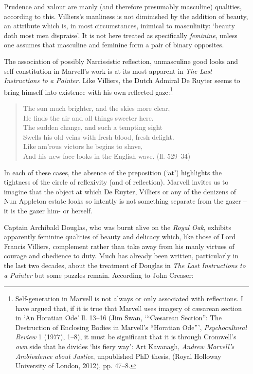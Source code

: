 ﻿\documentclass[12pt]{article}
\newcommand{\citedtitle}[1]{\textit{#1}}
\begin{document}
Prudence
and valour are manly (and therefore presumably masculine) qualities, according
to this. Villiers’s manliness is not diminished by the addition of beauty, an
attribute which is, in most circumstances, inimical to masculinity: ‘beauty
doth most men dispraise’. It is not here treated as specifically \emph{feminine}, unless one assumes
that masculine and feminine form a pair of binary opposites.

The
association of possibly Narcissistic reflection, unmasculine good looks and
self-constitution in Marvell’s work is at its most apparent in \citedtitle{The
Last Instructions to a Painter}. Like Villiers, the Dutch Admiral De Ruyter seems to
bring himself into existence with his own reflected gaze:\footnote{Self-generation in Marvell is not always or only associated with reflections. I have argued that, if it is true that Marvell uses imagery of cæsarean section in  ‘An Horatian
Ode’ ll. 13–16 (Jim Swan, ‘“Cæsarean Section”: The Destruction of Enclosing Bodies in Marvell’s “Horatian Ode”’, \citedtitle{Psychocultural Review} 1 (1977), 1–8), it must
be significant that it is through Cromwell’s \emph{own} side that he divides ‘his fiery way’: Art Kavanagh, \citedtitle{Andrew Marvell’s Ambivalence about Justice}, unpublished PhD
thesis, (Royal Holloway University of London, 2012), pp. 47–8.}

\begin{verse}
The sun much brighter, and the skies more clear,\\
He finds the air and all things sweeter here.\\
The sudden change, and such a tempting sight\\
Swells his old veins with fresh blood, fresh delight.\\
Like am’rous victors he begins to shave,\\
And his new face looks in the English wave. (ll. 529–34)
\end{verse}

In
each of these cases, the absence of the preposition (‘at’) highlights the
tightness of the circle of reflexivity (and of reflection). Marvell invites us
to imagine that the object at which De Ruyter, Villiers or any of the denizens
of Nun Appleton estate looks so intently is not something separate from the
gazer – it is the gazer him- or herself.

Captain
Archibald Douglas, who was burnt alive on the \textit{Royal Oak}, exhibits apparently
feminine qualities of beauty and delicacy which, like those of Lord Francis
Villiers, complement rather than take away from his manly virtues of courage
and obedience to duty. Much has already been written, particularly in the last
two decades, about the treatment of Douglas in \citedtitle{The Last Instructions to
a Painter} but some puzzles remain. According to John Creaser:
\end{document}
